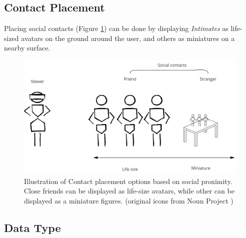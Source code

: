 
\subsection{Contact Placement}

Placing social contacts (Figure \ref{fig:continuum:contact-placement}) can be done by displaying \textit{Intimates} as life-sized avatars on the ground around the user, and others as miniatures on a nearby surface. 

\begin{figure}[ht]
    \centering
    \includegraphics[width=0.8\linewidth]{images/30-continuum/Continuum-placement.jpg}
    \caption{Illustration of Contact placement options based on social proximity. Close friends can be displayed as life-size avatars, while other can be displayed as a miniature figures. (original icons from Noun Project \cite{TheNounProjectInc.})}
    \label{fig:continuum:contact-placement}
\end{figure}



\pagebreak
\subsection{Data Type}

